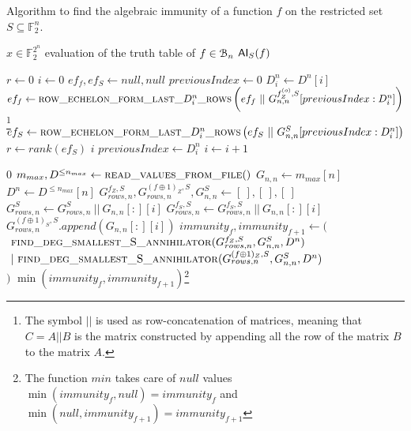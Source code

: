 \documentclass[11pt]{llncs}
\begin{document}




\begin{algorithm}\label{alg:RMApproach}
	\caption{Algorithm to find the algebraic immunity of a function $f$ on the restricted set $S\subseteq \mathbb{F}_2^n$.}
	\begin{algorithmic}[1]
		\Require $x\in \mathbb{F}_2^{2^n}$ evaluation of the truth table of $f\in \mathcal{B}_{n}$
		\Ensure $\mathsf{AI}_S(f)$
		
		\State $r \gets 0$
		\State $i \gets 0$
		\State $ef_f, ef_S \gets null, null$
		\State $previousIndex \gets 0$
		\State $D_i^n \gets D^n[i]$
		\State $ef_f\gets \mbox{\textsc{row\_echelon\_form\_last\_}}D_i^n\mbox{\textsc{\_rows}}\left(ef_f\ ||\  G_{n,n}^{f_Z^{(o)},S}[previousIndex:D_i^n]\right)$\footnote{The symbol $||$ is used as row-concatenation of matrices, meaning that $C = A||B$ is the matrix constructed by appending all the row of the matrix $B$ to the matrix $A$.}
		\State $ef_S \gets \mbox{\textsc{row\_echelon\_form\_last\_}}D_i^n\mbox{\textsc{\_rows}}\left(ef_S\ ||\ G_{n,n}^S[previousIndex:D_i^n]\right)$
		\State $r \gets rank\left(ef_S\right)$
		\State
		\Return $i$
		\EndIf
		\State $previousIndex \gets D_i^n$
		\State $i \gets i+1$
		\EndWhile
		\EndFunction
		\State
		
		\Return $0$
		\EndIf
		\State $m_{max}, D^{\leq n_{max}}\gets \mbox{\textsc{read\_values\_from\_file}}()$
		\State $G_{n,n}\gets m_{max}[n]$
		\State $D^n \gets D^{\leq n_{max}}[n]$
		\State $G_{rows,n}^{f_Z,S}, G_{rows,n}^{(f\oplus 1)_Z,S}, G_{n,n}^S \gets [\ ], [\ ], [\ ]$
		\State $G_{rows,n}^{S} \gets G_{rows,n}^{S}\ ||\ G_{n,n}[:][i]$
		\State $G_{rows,n}^{f_S,S} \gets G_{rows,n}^{f_S,S}\ ||\ G_{n,n}[:][i]$
		\Else
		\State $G_{rows,n}^{(f\oplus 1)_S,S}.append\left(G_{n,n}[:][i]\right)$
		\EndIf
		\EndIf
		\EndFor
		\State $immunity_f, immunity_{f+1} \leftarrow ($\\
		$\ \mbox{\textsc{find\_deg\_smallest\_S\_annihilator}}(G_{rows,n}^{f_Z,S}, G_{n,n}^S,D^{n})$\\
		$\ |\ \mbox{\textsc{find\_deg\_smallest\_S\_annihilator}}(G_{rows,n}^{(f\oplus 1)_Z,S}, G_{n,n}^S, D^{n})$\\
		$)$
		\State \Return $\min(immunity_f, immunity_{f+1})$\footnote{The function $min$ takes care of $null$ values $\min(immunity_f, null) = immunity_f$ and $\min(null, immunity_{f+1}) = immunity_{f+1}$}
	\end{algorithmic}
\end{algorithm}
\end{document}
